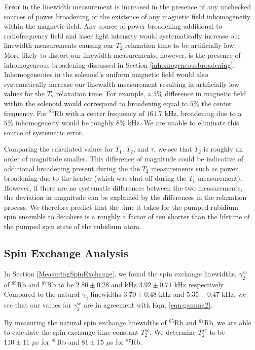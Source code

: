 Error in the linewidth measurement is increased in the presence of any unchecked sources of power broadening or the existence of any magnetic field inhomogeneity within the magnetic field.  Any source of power broadening additional to radiofrequency field and laser light intensity would systematically increase our linewidth measurements causing our $T_2$ relaxation time to be artificially low.  More likely to distort our linewidth measurements, however, is the presence of inhomogeneous broadening discussed in Section \ref{inhomogeneousbroadening}.  Inhomogeneities in the solenoid's uniform magnetic field would also systematically increase our linewidth measurement resulting in artificially low values for the $T_2$ relaxation time.  For example, a $5\%$ difference in magnetic field within the solenoid would correspond to broadening equal to $5\%$ the center frequency.  For $^{85}$Rb with a center frequency of $161.7$ kHz, broadening due to a $5\%$ inhomogeneity would be roughly $8\%$ kHz. We are unable to eliminate this source of systematic error.

Comparing the calculated values for $T_1$, $T_2$, and $\tau$, we see that $T_2$ is roughly an order of magnitude smaller.  This difference of magnitude could be indicative of additional broadening present during the the $T_2$ measurements such as power broadening due to the heater (which was shut off during the $T_1$ measurement).  However, if there are no systematic differences between the two measurements, the deviation in magnitude can be explained by the differences in the relaxation process.  We therefore predict that the time it takes for the pumped rubidium spin ensemble to decohere is a roughly a factor of ten shorter than the lifetime of the pumped spin state of the rubidium atom. 


\subsection{Spin Exchange Analysis}\label{SpinExchangeAnalysis}

In Section \ref{MeasuringSpinExchange}, we found the spin exchange linewidths, $\gamma^{\mathrm{se}}_2$ of $^{85}$Rb and $^{87}$Rb to be $2.80 \pm 0.28$ and kHz $3.92 \pm 0.71$ kHz respectively. Compared to the natural $\gamma_2$ linewidths $3.70 \pm 0.48$  kHz  and $5.35 \pm 0.47$ kHz, we see that our values for $\gamma^{\mathrm{se}}_2$ are in agreement with Eqn. \ref{eqn:gamma2}.

By measuring the natural spin exchange linewidths of $^{85}$Rb and $^{87}$Rb, we are able to calculate the spin exchange time constant $T^{se}_2$.  We determine $T^{se}_2$ to be $110 \pm 11$ $\mu$s for  $^{85}$Rb and $81 \pm 15$ $\mu$s for  $^{87}$Rb. 

